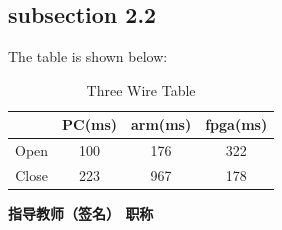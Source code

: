 \documentclass[10pt,letterpaper,onecolumn,fontset=none]{ctexart} %
\begin{document}
\subsection{subsection 2.2}
\lipsum[11]   %
The table is shown below:
\begin{table}[H]
	\centering
	\caption{Three Wire Table}
	\label{fig4}
	\begin{tabular}{cccc}
		\toprule
		&PC(ms) &arm(ms) &fpga(ms)\\
		\midrule
		Open &100 &176 &322\\
		Close &223 &967 &178\\
		\bottomrule	
	\end{tabular}
\end{table}

\mbox{} \vfill
\begin{flushright}
	\bfseries {}
	指导教师（签名） \underline{} 职称 \underline{}
\end{flushright}

\newpage

\printbibliography
\end{document}
